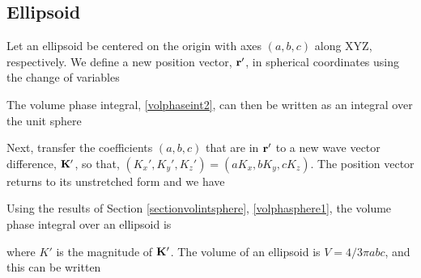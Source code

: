 \subsection{Ellipsoid}

Let an ellipsoid be centered on the origin with axes $(a, b, c)$ along XYZ, respectively. We define a new position vector, $\mathbf{r}'$, in spherical coordinates using the change of variables 

The volume phase integral, \eqref{volphaseint2}, can then be written as an integral over the unit sphere

Next, transfer the coefficients $(a,b,c)$ that are in $\mathbf{r}'$ to a new wave vector difference, $\mathbf{K}'$, so that, $(K_x',K_y',K_z') = (a K_x, b K_y, c K_z)$. The position vector returns to its unstretched form and we have

Using the results of Section \ref{sectionvolintsphere}, \eqref{volphasphere1}, the volume phase integral over an ellipsoid is 

\noindent where $K'$ is the magnitude of $\mathbf{K}'$.  The volume of an ellipsoid is $V = 4/3\pi abc$, and this can be written

\clearpage



\clearpage
\newpage










